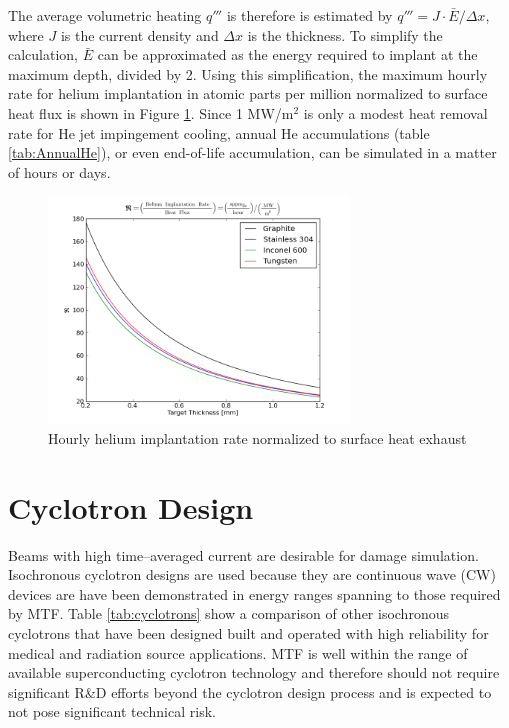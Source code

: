 \documentclass[final,3p,times,twocolumn]{elsarticle} %
\begin{document}
The average volumetric heating $q'''$ is therefore is estimated by $q''' = J \cdot \bar{E} / \Delta x$, where $J$ is the current density and $\Delta x$ is the thickness.  To simplify the calculation, $\bar{E}$ can be approximated as the energy required to implant at the maximum depth, divided by 2.  Using this simplification, the maximum hourly rate for helium implantation in atomic parts per million normalized to surface heat flux is shown in Figure \ref{fig:HourlyHeImplantation}.  Since 1 MW/m$^2$ is only a modest heat removal rate for He jet impingement cooling, annual He accumulations (table \ref{tab:AnnualHe}), or even end-of-life accumulation, can be simulated in a matter of hours or days.


\begin{figure}[htbp]
\begin{center}
\includegraphics[width=80mm]{Figures/HePerHour.png}
\caption{Hourly helium implantation rate normalized to surface heat exhaust}
\label{fig:HourlyHeImplantation}
\end{center}
\end{figure}


\section{Cyclotron Design}

Beams with high time--averaged current are desirable for damage simulation.  Isochronous cyclotron designs are used because they are continuous wave (CW) devices are have been demonstrated in energy ranges spanning to those required by MTF.  Table \ref{tab:cyclotrons} show a comparison of other isochronous cyclotrons that have been designed built and operated with high reliability for medical and radiation source applications.  MTF is well within the range of available superconducting cyclotron technology and therefore should not require significant R\&D efforts beyond the cyclotron design process and is expected to not pose significant technical risk.  
\end{document}
